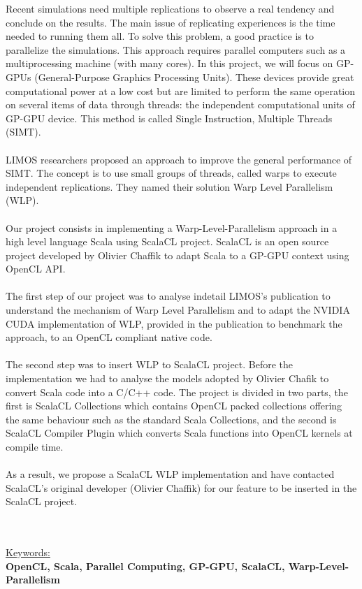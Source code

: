 \documentclass[a4paper,11pt]{report}
\begin{document}
\normalsize{
Recent simulations need multiple replications to observe a real tendency and conclude on the results. The main issue of replicating experiences is the time needed to running them all. To solve this problem, a good practice is to parallelize the simulations. This approach requires parallel computers such as a multiprocessing machine (with many cores). In this project, we will focus on GP-GPUs (General-Purpose Graphics Processing Units). These devices provide great computational power at a low cost but are limited to perform the same operation on several items of data through threads: the independent computational units of GP-GPU device. This method is called Single Instruction, Multiple Threads (SIMT).
}
\\ \\
\normalsize{
LIMOS researchers proposed an approach to improve the general performance of SIMT. The concept is to use small groups of threads, called warps to execute independent replications. They named their solution Warp Level Parallelism (WLP).
}
\\ \\
\normalsize{
Our project consists in implementing a Warp-Level-Parallelism approach in a high level language Scala using ScalaCL project. ScalaCL is an open source project developed by Olivier Chaffik to adapt Scala to a GP-GPU context using OpenCL API.
}
\\ \\
\normalsize{
The first step of our project was to analyse indetail LIMOS's publication to understand the mechanism of Warp Level Parallelism and to adapt the NVIDIA CUDA implementation of WLP, provided in the publication to benchmark the approach, to an OpenCL compliant native code.
}
\\ \\
\normalsize{
 The second step was to insert WLP to ScalaCL project. Before the implementation we had to analyse the models adopted by Olivier Chafik to convert Scala code into a C/C++ code. The project is divided in two parts, the first is ScalaCL Collections which contains OpenCL packed collections offering the same behaviour such as the standard Scala Collections, and the second is ScalaCL Compiler Plugin which converts Scala functions into OpenCL kernels at compile time.
}
\\ \\
\normalsize{
As a result, we propose a ScalaCL WLP implementation and have contacted ScalaCL's original developer (Olivier Chaffik) for our feature to be inserted in the ScalaCL project.
}
\\ \\ \\
\begin{flushleft}
\large{ \underline {Keywords:}\bigskip}\\
{\bf OpenCL, Scala, Parallel Computing, GP-GPU, ScalaCL,  Warp-Level-Parallelism }
\end{flushleft}
\end{document}
